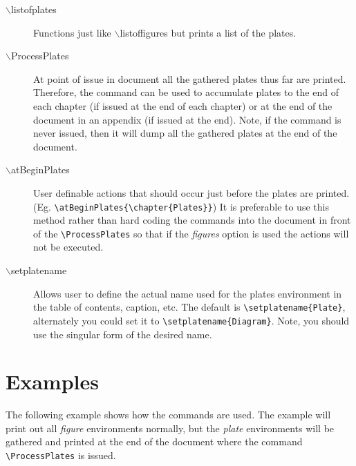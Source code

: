 \documentclass{article}
\begin{document}
\begin{description}
  \item[$\backslash$listofplates] Functions just like
  $\backslash$listoffigures but prints a list of the plates.
  \item[$\backslash$ProcessPlates] At point of issue in document
  all the gathered plates thus far are printed.
  Therefore, the command can be used to accumulate plates to the
  end of each chapter (if issued at the end of each chapter) or at
  the end of the document in an appendix (if issued at the end).
  Note, if the command is never issued, then it will dump all the
  gathered plates at the end of the document.
  \item[$\backslash$atBeginPlates] User definable actions that
  should occur just before the plates are printed.  (Eg.
  \lstinline!\atBeginPlates{\chapter{Plates}}!)  It is preferable to use this
  method
  rather than hard coding the commands into the document in front
  of the \lstinline!\ProcessPlates! so that if the \emph{figures}
  option is used the actions will not be executed.
  \item[$\backslash$setplatename] Allows user to define the actual
  name used for the plates environment in the table of contents, caption, etc.
  The default is \lstinline!\setplatename{Plate}!, alternately you
  could set it to \lstinline!\setplatename{Diagram}!.  Note, you
  should use the singular form of the desired name.
\end{description}

\section{Examples}
The following example shows how the commands are used.  The
example will print out all \emph{figure} environments normally,
but the \emph{plate} environments will be gathered and printed at
the end of the document where the command
\lstinline!\ProcessPlates! is issued.
\end{document}
